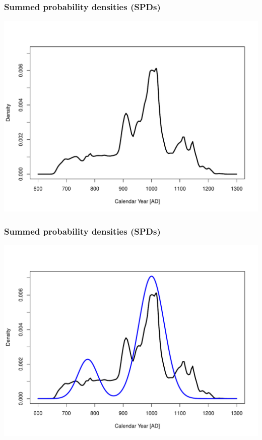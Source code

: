 \documentclass{beamer}
\begin{document}
\begin{frame}[t]
  \frametitle{Summed probability densities (SPDs)}
    \includegraphics[height=.85\textheight]{spdall.pdf}
\end{frame}

\begin{frame}[t]
  \frametitle{Summed probability densities (SPDs)}
    \includegraphics[height=.85\textheight]{spdall_sim.pdf}
\end{frame}
\end{document}
